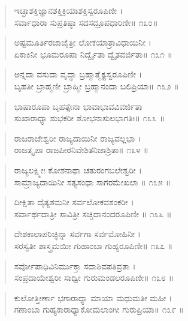 \begin{verse}
ಇಚ್ಛಾಶಕ್ತಿಜ್ಞಾನಶಕ್ತಿಕ್ರಿಯಾಶಕ್ತಿಸ್ವರೂಪಿಣೀ ।\\ಸರ್ವಾಧಾರಾ ಸುಪ್ರತಿಷ್ಠಾ  ಸದಸದ್ರೂಪಧಾರಿಣೀ\num{॥ ೧೩೦॥}
\end{verse}

\begin{verse}
ಅಷ್ಟಮೂರ್ತಿರಜಾಜೈತ್ರೀ ಲೋಕಯಾತ್ರಾವಿಧಾಯಿನೀ ।\\ಏಕಾಕಿನೀ ಭೂಮರೂಪಾ ನಿರ್ದ್ವೈತಾ ದ್ವೈತವರ್ಜಿತಾ\num{॥ ೧೩೧ ॥}
\end{verse}

\begin{verse}
ಅನ್ನದಾ ವಸುದಾ  ವೃದ್ಧಾ ಬ್ರಹ್ಮಾತ್ಮೈಕ್ಯಸ್ವರೂಪಿಣೀ ।\\ಬೃಹತೀ ಬ್ರಾಹ್ಮಣೀ ಬ್ರಾಹ್ಮೀ ಬ್ರಹ್ಮಾನಂದಾ ಬಲಿಪ್ರಿಯಾ\num{॥ ೧೩೨ ॥}
\end{verse}

\begin{verse}
ಭಾಷಾರೂಪಾ ಬೃಹತ್ಸೇನಾ ಭಾವಾಭಾವವಿವರ್ಜಿತಾ \\ಸುಖಾರಾಧ್ಯಾ ಶುಭಕರೀ ಶೋಭನಾಸುಲಭಾಗತಿಃ\num{॥ ೧೩೩ ॥}
\end{verse}

\begin{verse}
ರಾಜರಾಜೇಶ್ವರೀ ರಾಜ್ಯದಾಯಿನೀ ರಾಜ್ಯವಲ್ಲಭಾ ।\\ರಾಜತ್ಕೃಪಾ ರಾಜಪೀಠನಿವೇಶಿತನಿಜಾಶ್ರಿತಾ\num{॥ ೧೩೪ ॥}
\end{verse}

\begin{verse}
ರಾಜ್ಯಲಕ್ಷ್ಮೀಃ ಕೋಶನಾಥಾ  ಚತುರಂಗಬಲೇಶ್ವರೀ ।\\ಸಾಮ್ರಾಜ್ಯದಾಯಿನೀ ಸತ್ಯಸಂಧಾ ಸಾಗರಮೇಖಲಾ \num{॥ ೧೩೫ ॥}
\end{verse}

\begin{verse}
ದೀಕ್ಷಿತಾ ದೈತ್ಯಶಮನೀ ಸರ್ವಲೋಕವಶಂಕರೀ ।\\ಸರ್ವಾರ್ಥದಾತ್ರೀ ಸಾವಿತ್ರೀ ಸಚ್ಚಿದಾನಂದರೂಪಿಣೀ \num{॥ ೧೩೬ ॥}
\end{verse}

\begin{verse}
ದೇಶಕಾಲಾಪರಿಚ್ಛಿನ್ನಾ ಸರ್ವಗಾ ಸರ್ವಮೋಹಿನೀ ।\\ಸರಸ್ವತೀ ಶಾಸ್ತ್ರಮಯೀ ಗುಹಾಂಬಾ ಗುಹ್ಯರೂಪಿಣೀ\num{॥ ೧೩೭ ॥}
\end{verse}

\begin{verse}
ಸರ್ವೋಪಾಧಿವಿನಿರ್ಮುಕ್ತಾ ಸದಾಶಿವಪತಿವ್ರತಾ ।\\ಸಂಪ್ರದಾಯೇಶ್ವರೀ  ಸಾಧ್ವೀ ಗುರುಮಂಡಲರೂಪಿಣೀ\num{॥ ೧೩೮ ॥}
\end{verse}

\begin{verse}
ಕುಲೋತ್ತೀರ್ಣಾ ಭಗಾರಾಧ್ಯಾ ಮಾಯಾ ಮಧುಮತೀ ಮಹೀ ।\\ಗಣಾಂಬಾ ಗುಹ್ಯಕಾರಾಧ್ಯಾಕೋಮಲಾಂಗೀ ಗುರುಪ್ರಿಯಾ\num{॥ ೧೩೯ ॥}
\end{verse}

